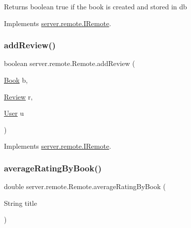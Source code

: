 \begin{DoxyReturn}{Returns}
boolean true if the book is created and stored in db 
\end{DoxyReturn}


Implements \hyperlink{interfaceserver_1_1remote_1_1_i_remote_aec137a7435ccced1aa7350b2fd2a1947}{server.\+remote.\+I\+Remote}.

\mbox{\label{classserver_1_1remote_1_1_remote_af94163cf6d5c40cfc880eb517d56aa48}} 
\subsubsection{\texorpdfstring{add\+Review()}{addReview()}}
{\footnotesize\ttfamily boolean server.\+remote.\+Remote.\+add\+Review (\begin{DoxyParamCaption}\item[{\hyperlink{classserver_1_1data_1_1_book}{Book}}]{b,  }\item[{\hyperlink{classserver_1_1data_1_1_review}{Review}}]{r,  }\item[{\hyperlink{classserver_1_1data_1_1_user}{User}}]{u }\end{DoxyParamCaption})}



Implements \hyperlink{interfaceserver_1_1remote_1_1_i_remote_ab24486281e8c228ee82a48a5ca70297b}{server.\+remote.\+I\+Remote}.

\mbox{\label{classserver_1_1remote_1_1_remote_afd253ddc199a34a1e05317878f957cc9}} 
\subsubsection{\texorpdfstring{average\+Rating\+By\+Book()}{averageRatingByBook()}}
{\footnotesize\ttfamily double server.\+remote.\+Remote.\+average\+Rating\+By\+Book (\begin{DoxyParamCaption}\item[{String}]{title }\end{DoxyParamCaption})}



